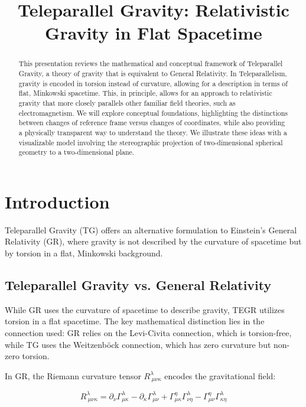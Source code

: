 \documentclass[12pt]{article}
\title{Teleparallel Gravity: Relativistic Gravity in Flat Spacetime}
\author{}
\date{}
\begin{document}
\maketitle

\begin{abstract}
This presentation reviews the mathematical and conceptual framework of Teleparallel Gravity, a theory of gravity that is equivalent to General Relativity. In Teleparallelism, gravity is encoded in torsion instead of curvature, allowing for a description in terms of flat, Minkowski spacetime. This, in principle, allows for an approach to relativistic gravity that more closely parallels other familiar field theories, such as electromagnetism. We will explore conceptual foundations, highlighting the distinctions between changes of reference frame versus changes of coordinates, while also providing a physically transparent way to understand the theory. We illustrate these ideas with a visualizable model involving the stereographic projection of two-dimensional spherical geometry to a two-dimensional plane.
\end{abstract}

\tableofcontents
\newpage

\section{Introduction}
Teleparallel Gravity (TG) offers an alternative formulation to Einstein's General Relativity (GR), where gravity is not described by the curvature of spacetime but by torsion in a flat, Minkowski background.

\subsection{Teleparallel Gravity vs. General Relativity}
While GR uses the curvature of spacetime to describe gravity, TEGR utilizes torsion in a flat spacetime. The key mathematical distinction lies in the connection used: GR relies on the Levi-Civita connection, which is torsion-free, while TG uses the Weitzenböck connection, which has zero curvature but non-zero torsion.

In GR, the Riemann curvature tensor \( R^\lambda_{\ \mu\nu\kappa} \) encodes the gravitational field:

\[
R^\lambda_{\ \mu\nu\kappa} = \partial_\nu \Gamma^\lambda_{\mu\kappa} - \partial_\kappa \Gamma^\lambda_{\mu\nu} + \Gamma^\eta_{\mu\kappa} \Gamma^\lambda_{\nu\eta} - \Gamma^\eta_{\mu\nu} \Gamma^\lambda_{\kappa\eta}
\]
\end{document}
